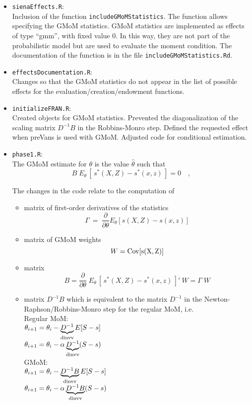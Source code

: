 \documentclass[a4paper,11pt]{article}
\begin{document}
\begin{itemize}
\item \texttt{sienaEffects.R}:\\
Inclusion of the function \texttt{includeGMoMStatistics}. The function allows specifying the GMoM statistics. GMoM statistics are implemented as effects of type ``gmm'', with fixed value 0. In this way, they are not part of the probabilistic model but are used to evaluate the moment condition. The documentation of the function is in the file \texttt{includeGMoMStatistics.Rd}.

\item \texttt{effectsDocumentation.R}:\\
Changes so that the GMoM statistics do not appear in the list of possible effects for the evaluation/creation/endowment functions.

\item \texttt{initializeFRAN.R}:\\
Created objects for GMoM statistics. Prevented the diagonalization of the scaling matrix $D^{-1}B$ in the Robbins-Monro step. Defined the requested effect when preVans is used with GMoM. Adjusted code for conditional estimation.

\item \texttt{phase1.R}:\\ 
The GMoM estimate for $\theta$ is the value $\hat{\theta}$ such that
\[B\;E_{\theta}\,[\,s^*(X,Z)-s^*(x,z)\,]=0\quad,\]
\noindent

The changes in the code relate to the computation of 
\begin{itemize}
	\item matrix of first-order derivatives of the statistics
	\[\Gamma\ = \ \frac{\partial}{\partial\theta}E_{\theta}[s(X,Z)-s(x,z)]\]
	\medskip
  \item matrix of GMoM weights
	\[W=\rm{Cov}[s(X,Z)]\]
	\medskip
	\item matrix \[B=\frac{\partial}{\partial\theta}\;E_{\theta}\,[\,s^*(X,Z)-
s^*(x,z)\,]'\:W=\Gamma\; W\]
\medskip
\item matrix $D^{-1}B$ which is equivalent to the matrix $D^{-1}$ in the Newton-Raphson/Robbins-Monro step for the regular MoM, i.e.
\medskip\\
Regular MoM:\\
$\theta_{i+1}=\theta_{i}-\underbrace{D^{-1}}_{\rm{dinvv}}E[S-s]$\\
$\theta_{i+1}=\theta_{i}-\alpha\underbrace{D^{-1}}_{\rm{dinvv}}(S-s)$
\medskip\\
GMoM:\\
$\theta_{i+1}=\theta_{i}-\underbrace{D^{-1}B}_{\rm{dinvv}}E[S-s]$\\
$\theta_{i+1}=\theta_{i}-\alpha\underbrace{D^{-1}B}_{\rm{dinvv}}(S-s)$
\bigskip\\


\end{itemize}
\end{itemize}
\end{document}
